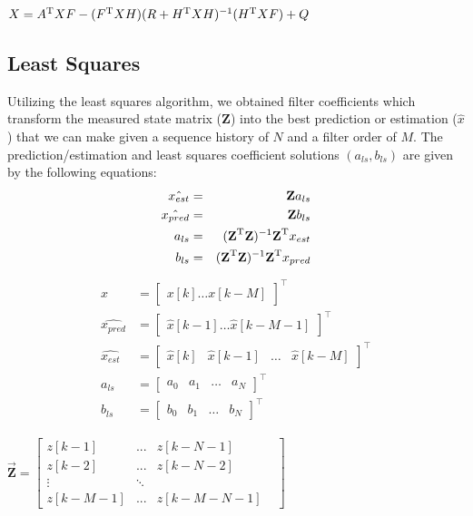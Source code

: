 \documentclass[twocolumn,letterpaper]{IEEEAerospaceCLS}  %
\begin{document}
$X=A^{\rm T}XF-(F^{\rm T}XH)(R+H^{\rm T}XH)^{-1}(H^{\rm T}XF) + Q $

\subsection{Least Squares}

Utilizing the least squares algorithm, we obtained filter coefficients which transform the measured state matrix (\textbf{Z}) into the best prediction or estimation ($\hat{x}$) that we can make given a sequence history of $N$ and a filter order of $M$. The prediction/estimation and least squares coefficient solutions $(a_{ls}, b_{ls})$ are given by the following equations:
\begin{eqnarray*}
\hat{x_{est}}&=&\textbf{Z}a_{ls} \\ 
\hat{x_{pred}}&=&\textbf{Z}b_{ls} \\ 
a_{ls}&=&(\textbf{Z}^{\rm T}\textbf{Z})^{-1}\textbf{Z}^{\rm T}x_{est} \\
b_{ls}&=&(\textbf{Z}^{\rm T}\textbf{Z})^{-1}\textbf{Z}^{\rm T}x_{pred}
\end{eqnarray*}
\begin{align}
\begin{aligned}
x&= \left[ \begin{matrix}  x[k]   \dots    x[k-M] \end{matrix} \right]^\top\\
\hat{x_{pred}} &= \left[ \begin{matrix} \hat{x}[k-1]  \dots \hat{x}[k-M-1]\end{matrix} \right]^\top\\
\hat{x_{est}} &= \left[ \begin{matrix}   \hat{x}[k]  & \hat{x}[k-1]  &  \dots & \hat{x}[k-M]\end{matrix}\right]^\top\\ \nonumber
a_{ls}&=  \left[ \begin{matrix}    a_{0} &  a_{1} &  \dots  & a_{N} \end{matrix} \right]^\top\\
b_{ls}&= \left[ \begin{matrix}   b_{0}   & b_{1}  & \dots &  b_{N}\end{matrix}\right]^\top
\end{aligned}
\end{align}

$\vec{\textbf{Z}} = \begin{bmatrix}
   z[k-1]   & ...       & z[k-N-1]     & \\
   z[k-2]   & ...       & z[k-N-2]     & \\
   \vdots             &  \ddots   &              & \\
   z[k-M-1] & ...       & z[k-M-N-1]  
\end{bmatrix}$
\end{document}
